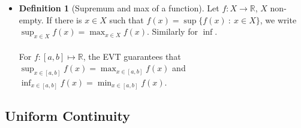 \documentclass{article}
\newcommand{\R}{\mathbb{R}}
\newcommand{\N}{\mathbb{N}}
\newcommand{\seq}[2]{(#1_{#2})_{#2 \in \N}}
\newcommand{\sseq}[3]{(#1_{#2_#3})_{#3 \in \N}}
\newcommand{\?}{\stackrel{?}{=}}
\theoremstyle{definition} %
\newtheorem{definition}[subsection]{Definition} %
\begin{document}
\begin{itemize}
\begin{proof}
              Now we must show that $f$ bounded $\implies X$ bounded $\implies M = \sup(X)$ and $m = \inf(X)$ exists. So we need to show that $M = f(x_g), x_g \in [a, b]$ and $m = f(x_i), x_i \in [a, b]$. From the characterization of infimum, we know $\forall \varepsilon > 0 \ \exists q_\epsilon \in X$ such that $q_\varepsilon - m \leq \varepsilon$. Then we have that $q_\varepsilon \in X \rightarrow f(x_\varepsilon)$, $x_\varepsilon \in [a, b]$. This means that $f(x_\varepsilon) - m \leq \varepsilon$. Taking $\varepsilon = \nicefrac{1}{n}$ we obtain $m \leq f(x_n) \leq m + \nicefrac{1}{n} \implies f(x_n) \rightarrow m$ by the Squeeze Theorem. \\\\
              But $\seq{x}{n}$ bounded implies there exists some subsequence $\sseq{x}{n}{k}$ such that $x_{n_k} \in [a, b] \implies x_{n_k} \rightarrow l \in [a, b]$. So
              $$m = \lim_{k \to \infty} f(x_{n_k}) = f(\lim_{k \to \infty} x_{n_k}) = f(l).$$
              Take $x_i = l \in [a, b]$.
          \end{proof}
    \item[]
          \begin{definition}[Supremum and max of a function]
              Let $f: X \to \R$, $X$ non-empty. If there is $x \in X$ such that $f(x) = \sup\{f(x) \ : \ x \in X\}$, we write $\sup_{x \in X} f(x) = \max_{x \in X} f(x)$. Similarly for $\inf$. \\\\
              For $f: [a, b] \mapsto \R$, the EVT guarantees that $\sup_{x \in [a, b]} f(x) = \max_{x \in [a, b]} f(x)$ and $\inf_{x \in [a, b]} f(x) = \min_{x \in [a, b]} f(x)$.
          \end{definition}
\end{itemize}

\subsection{Uniform Continuity}
\end{document}
